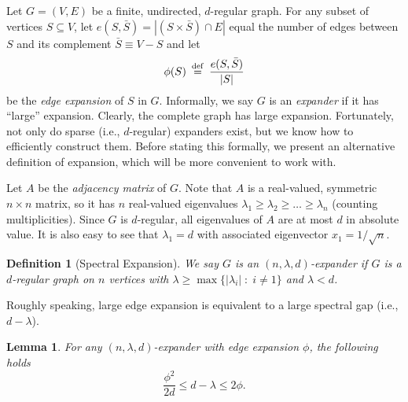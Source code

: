 \documentclass{article}
\newtheorem{definition}[theorem]{Definition}
\newtheorem{lemma}[theorem]{Lemma}
\newcommand{\eqdef}{\mathbin{\stackrel{\rm def}{=}}}
\begin{document}
Let $G = (V, E)$ be a finite, undirected, $d$-regular graph.
For any subset of vertices $S \subseteq V$,
let $e(S, \bar{S}) = |(S\times \bar{S})\cap E|$ equal the number of edges
between $S$ and its complement $\bar{S} \equiv V - S$ and
let
\begin{align*}
\phi(S) \;\eqdef\; \frac{e(S, \bar{S})}{|S|} %
\end{align*}
be the \emph{edge expansion} of $S$ in $G$.
Informally, we say $G$ is an \emph{expander} if it has ``large'' expansion.
Clearly, the complete graph has large expansion.
Fortunately, not only do sparse (i.e., $d$-regular) expanders exist,
but we know how to efficiently construct them.
Before stating this formally, we present an alternative definition of
expansion, which will be more convenient to work with.

Let $A$ be the \emph{adjacency matrix} of $G$.
Note that $A$ is a real-valued, symmetric $n \times n$ matrix,
so it has $n$ real-valued eigenvalues $\lambda_1 \ge \lambda_2 \ge \dots \ge \lambda_n$
(counting multiplicities).
Since $G$ is $d$-regular, all eigenvalues of $A$ are at most $d$ in absolute value.
It is also easy to see that $\lambda_1=d$ with associated
eigenvector $x_1 = 1/\sqrt{n}$.

\begin{definition}[Spectral Expansion]
We say $G$ is an $(n, \lambda, d)$-expander if $G$ is a $d$-regular graph
on $n$ vertices with $\lambda \ge \max \{|\lambda_i| \;:\; i \neq 1\}$
and $\lambda < d$.
\end{definition}

Roughly speaking, large edge expansion is equivalent to a large spectral gap (i.e., $d - \lambda$).

\begin{lemma}%
For any $(n, \lambda, d)$-expander with edge expansion $\phi$, the following holds
$$
\frac{\phi^2}{2d} \le d - \lambda \le 2\phi.
$$
\end{lemma}
\end{document}
